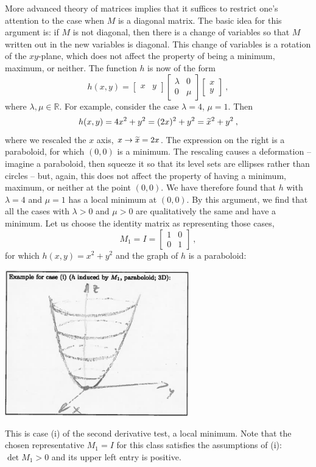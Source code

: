 \begin{remark}
More advanced theory of matrices implies that it suffices to restrict one's attention to the case when $M$ is a diagonal matrix. The basic idea for this argument is: if $M$ is not diagonal, then there is a change of variables so that $M$ written out in the new variables is diagonal. This change of variables is a rotation of the $xy$-plane, which does not affect the property of being a minimum, maximum, or neither. The function $h$ is now of the form
\[ h(x,y) = \begin{bmatrix}	x & y \end{bmatrix}  
\begin{bmatrix}	\lambda & 0 \\ 0 & \mu \end{bmatrix}
\begin{bmatrix} x \\ y \end{bmatrix} \:, \]
where $\lambda,\mu\in\mathbb{R}$. For example, consider the case $\lambda = 4$, $\mu = 1$. Then
\[ h(x,y) = 4 x^2 + y^2 = (2x)^2 + y^2 = \widetilde{x}^2+y^2 \:, \]
where we rescaled the $x$ axis, $x \rightarrow \widetilde{x} = 2x$. The expression on the right is a paraboloid, for which $(0,0)$ is a minimum. The rescaling causes a deformation -- imagine a paraboloid, then squeeze it so that its level sets are ellipses rather than circles -- but, again, this does not affect the property of having a minimum, maximum, or neither at the point $(0,0)$. We have therefore found that $h$ with $\lambda = 4$ and $\mu = 1$ has a local minimum at $(0,0)$. By this argument, we find that all the cases with $\lambda > 0$ and $\mu > 0$ are qualitatively the same and have a minimum. Let us choose the identity matrix as representing those cases,
\[ M_1 = I = \begin{bmatrix} 1 & 0 \\ 0 & 1 \end{bmatrix} \:, \]
for which $h(x,y)=x^2+y^2$ and the graph of $h$ is a paraboloid:
\begin{center}
	\includegraphics[width=0.6\textwidth]{./Figures/f307.png}
\end{center}
This is case (i) of the second derivative test, a local minimum. Note that the chosen representative $M_1=I$ for this class satisfies the assumptions of (i): $\det M_1 > 0$ and its upper left entry is positive.


\end{remark}
